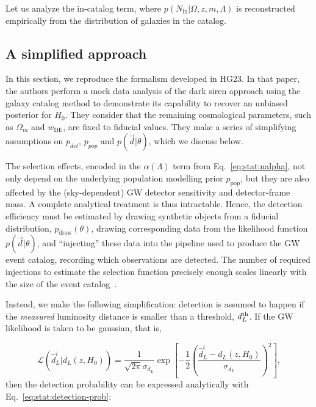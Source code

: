 \documentclass[%
preprint,
nofootinbib,
 amsmath,amssymb,
 aps,
]{revtex4-2}
\newcommand{\given}[2]{p( #1 | #2 )}
\newcommand{\ppop}[0]{p_{\text{pop}}}
\begin{document}
Let us analyze the in-catalog term, where $\given{N_\text{in}}{\Omega, z, m, \Lambda}$ is
reconstructed empirically from the distribution of galaxies in the catalog.




\subsection{A simplified approach}
\label{sec:stat:simplified}

In this section, we reproduce the formalism developed in HG23. In that paper, the authors perform a
mock data analysis of the dark siren approach using the galaxy catalog method to demonstrate its
capability to recover an unbiased posterior for $H_0$. They consider that the remaining
cosmological parameters, such as $\Omega_m$ and $w_\text{DE}$, are fixed to fiducial values. They
make a series of simplifying assumptions on $p_{det}$, $p_{pop}$ and $\given{\vec{d}}{\theta}$,
which we discuss below.

The selection effects, encoded in the $\alpha (\Lambda )$ term from Eq.~\eqref{eq:stat:nalpha}, not
only depend on the underlying population modelling prior $\ppop$, but they are also affected by the
(sky-dependent) GW detector sensitivity and detector-frame mass. A complete analytical treatment is
thus intractable. Hence, the detection efficiency must be estimated by drawing synthetic objects
from a fiducial distribution, $p_\text{draw}(\theta)$, drawing corresponding data from the
likelihood function $\given{\vec{d}}{\theta}$, and “injecting” these data into the pipeline used to
produce the GW event catalog, recording which observations are detected. The number of required
injections to estimate the selection function precisely enough scales linearly with the size of the
event catalog~\cite{essick2022precision}.

Instead, we make the following simplification: detection is assumed to happen if the
\textit{measured} luminosity distance is smaller than a threshold, $d_L^{\rm{th}}$. If the GW
likelihood is taken to be gaussian, that is,

\begin{equation}
	\label{eq:stat:gw-gaussian-likelihood}
	\mathcal{L}(\hat{d}_L^i | d_L(z, H_0))
	= \frac{1}{\sqrt{2 \pi} \sigma_{d_L}} \exp{\left [-\frac{1}{2} \left (\frac{\hat{d}_L^i - d_L(z, H_0)}{\sigma_{d_L}} \right )^2 \right ]},
\end{equation}
then the detection probability can be expressed analytically with Eq.~\eqref{eq:stat:detection-prob}:
\end{document}
